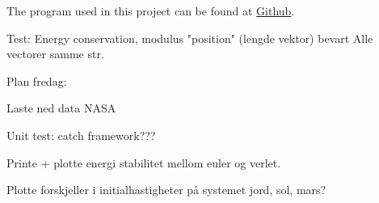 


The program used in this project can be found at \href{https://github.com/kjetka/Project3}{Github}. 




Test: 		Energy conservation, modulus "position" (lengde vektor) bevart
				Alle vectorer samme str.


Plan fredag:

	Laste ned data NASA


	Unit test: catch framework???

	Printe + plotte energi stabilitet mellom euler og verlet.

	Plotte forskjeller i initialhastigheter på systemet jord, sol, mars?
	
